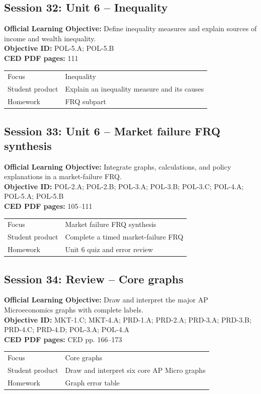 \documentclass[11pt,a4paper]{article}
\newcommand{\objectivebox}[1]{\noindent\colorbox{aplight}{\parbox{0.96\textwidth}{#1}}}
\begin{document}
\subsection{Session 32: Unit 6 -- Inequality}
\objectivebox{\textbf{Official Learning Objective:} Define inequality measures and explain sources of income and wealth inequality.\\\textbf{Objective ID:} POL-5.A; POL-5.B\\\textbf{CED PDF pages:} 111}\par\vspace{0.4em}
\begin{tabularx}{\textwidth}{p{3.0cm}Y}
\toprule
Focus & Inequality\\
Student product & Explain an inequality measure and its causes\\
Homework & FRQ subpart\\
\bottomrule
\end{tabularx}
\subsection{Session 33: Unit 6 -- Market failure FRQ synthesis}
\objectivebox{\textbf{Official Learning Objective:} Integrate graphs, calculations, and policy explanations in a market-failure FRQ.\\\textbf{Objective ID:} POL-2.A; POL-2.B; POL-3.A; POL-3.B; POL-3.C; POL-4.A; POL-5.A; POL-5.B\\\textbf{CED PDF pages:} 105–111}\par\vspace{0.4em}
\begin{tabularx}{\textwidth}{p{3.0cm}Y}
\toprule
Focus & Market failure FRQ synthesis\\
Student product & Complete a timed market-failure FRQ\\
Homework & Unit 6 quiz and error review\\
\bottomrule
\end{tabularx}
\subsection{Session 34: Review -- Core graphs}
\objectivebox{\textbf{Official Learning Objective:} Draw and interpret the major AP Microeconomics graphs with complete labels.\\\textbf{Objective ID:} MKT-1.C; MKT-4.A; PRD-1.A; PRD-2.A; PRD-3.A; PRD-3.B; PRD-4.C; PRD-4.D; POL-3.A; POL-4.A\\\textbf{CED PDF pages:} CED pp. 166–173}\par\vspace{0.4em}
\begin{tabularx}{\textwidth}{p{3.0cm}Y}
\toprule
Focus & Core graphs\\
Student product & Draw and interpret six core AP Micro graphs\\
Homework & Graph error table\\
\bottomrule
\end{tabularx}
\end{document}
